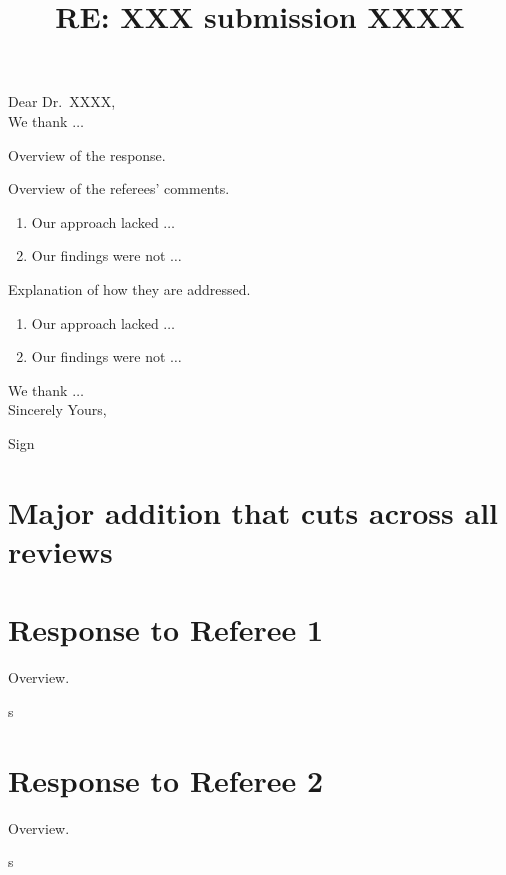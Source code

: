 \documentclass[12pt]{article}
\title{RE: XXX submission XXXX}
\date{}
\makeatletter
\newcommand{\rcomment}[1]{%
\vspace{10pt}
\begin{sectionbox}
s #1
\end{sectionbox}
\vspace{10pt}
}
\renewcommand{\maketitle}{\bgroup\setlength{\parindent}{0pt}
\begin{flushleft}
\Large  \textbf{\@title}
\end{flushleft}\egroup
}
\makeatother
\begin{document}
\maketitle

\bigskip
\noindent Dear Dr.~XXXX, \\

We thank $\dots$ 

Overview of the response.

Overview of the referees' comments.


\begin{enumerate}
    \itemsep0em
    \item Our approach lacked $\dots$ 
    \item Our findings were not $\dots$ 
\end{enumerate}

Explanation of how they are addressed. 


\begin{enumerate}
    \itemsep0em
    \item Our approach lacked $\dots$ 
    \item Our findings were not $\dots$ 
\end{enumerate}

We thank $\dots$ \\

Sincerely Yours,

Sign

\listoftodos


\clearpage
\tableofcontents
\clearpage


\section{Major addition that cuts across all reviews}\label{sec:major}

\lipsum[1]{} 


%
%
\clearpage
\section{Response to Referee 1}

Overview. 

\rcomment{%
\lipsum[1]{} 
}

\lipsum[1]{}

%
%
\clearpage
\section{Response to Referee 2}

Overview. 

\rcomment{%
\lipsum[1]{} 
}

\lipsum[1]{}

%
%
\clearpage
\printbibliography{}
\end{document}
